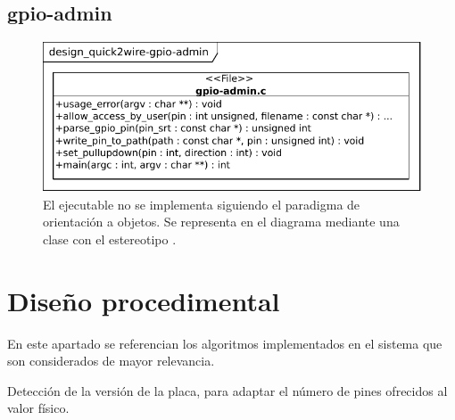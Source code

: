 \documentclass[letterpaper,10pt,spanish]{sphinxmanual}
\begin{document}
\subsection{gpio-admin}
\label{design/static:gpio-admin}\begin{figure}[htbp]
\centering
\capstart

\includegraphics{design_quick2wire-gpio-admin.pdf}
\caption{El ejecutable  no se implementa siguiendo el paradigma de orientación a objetos. Se representa en el diagrama mediante una clase con el estereotipo .}\end{figure}


\section{Diseño procedimental}
\label{design/procedimental:diseno-procedimental}\label{design/procedimental::doc}
En este apartado se referencian los algoritmos implementados en el sistema que son considerados de mayor relevancia.

Detección de la versión de la placa, para adaptar el número de pines ofrecidos al valor físico.
\end{document}
